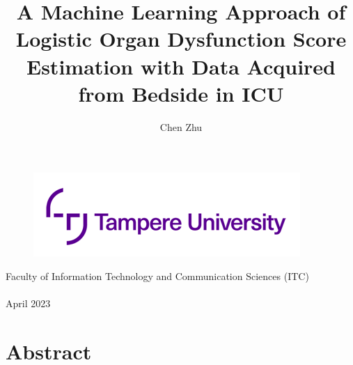 \documentclass[12pt,a4paper,english
]{tunithesis}
\author{Chen Zhu}
\title{A Machine Learning Approach of Logistic Organ Dysfunction Score Estimation with Data Acquired from Bedside in ICU} %
\begin{document}
\makeatletter



%
\thispagestyle{empty}
\vspace*{-.5cm}\noindent

\begin{figure}
    \vspace{-1.3cm}
    \advance\leftskip-2.5cm
    \noindent\includegraphics{img/tunilogo.png}
\end{figure}
 
\vspace{2.5cm}
\begin{flushright}
\noindent\textsf{\LARGE{\@author}}

\noindent\vspace{0.5cm}

\noindent\Huge{\textsf{\textbf{\textcolor{tunipurple}{\@title}}}}
\end{flushright}
\vspace{10.7cm} %

\begin{flushright}  
    \begin{spacing}{1.0}
      \textsf{Faculty of Information Technology and Communication Sciences (ITC)\\
      \@thesistype\\
      April 2023}
    \end{spacing}
\end{flushright}

\if@twoside
\clearpage
\fi




\chapter*{Abstract}
\end{document}
